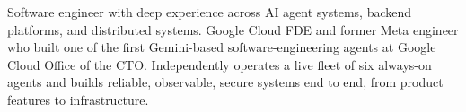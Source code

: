 


Software engineer with deep experience across AI agent systems, backend platforms, and distributed systems. Google Cloud FDE and former Meta engineer who built one of the first Gemini-based software-engineering agents at Google Cloud Office of the CTO. Independently operates a live fleet of six always-on agents and builds reliable, observable, secure systems end to end, from product features to infrastructure.







